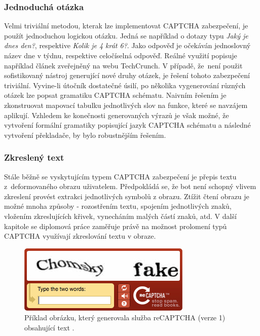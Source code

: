 \documentclass[
  field=ainfp,
  master=true,
  biblatex,
  sourcecodes=false,
  theorems=false,
  glossaries,
  index
]{kidiplom}
\begin{document}
\subsubsection*{Jednoduchá otázka}
Velmi triviální metodou, kterak lze implementovat CAPTCHA zabezpečení, je použít jednoduchou logickou otázku. Jedná se například o dotazy typu \textit{Jaký je dnes den?}, respektive \textit{Kolik je 4 krát 6?}. Jako odpověď je očekáván jednoslovný název dne v týdnu, respektive celočíselná odpověď. Reál\-né využití popisuje například článek zveřejněný na webu TechCrunch\cite{web:textcaptcha}. V případě, že~není použit sofistikovaný nástroj generující nové druhy otázek, je řešení tohoto zabez\-pe\-čení triviální. Vyvine-li útočník dostatečné úsilí, po několika vygenerování různých otázek lze popsat gramatiku CAPTCHA schématu. Naivním řešením je zkonstruovat mapovací tabulku jednotlivých slov na funkce, které se navzájem aplikují. Vzhledem ke konečnosti generovaných výrazů je však možné, že vytvoření formální gramatiky popisující jazyk CAPTCHA schématu a následné vytvoření překladače, by bylo robustnějším řešením. 

\subsubsection*{Zkreslený text}
Stále běžně se vyskytujícím typem CAPTCHA zabezpečení je přepis textu z~deformovaného obrazu uživatelem. Předpokládá se, že bot není schopný vlivem zkreslení provést extrakci jednotlivých symbolů z obrazu. Ztížit čtení obrazu je možné mnoha způsoby - rozostřením textu, spojením jednotlivých znaků, vložením zkreslujících křivek, vynecháním malých částí znaků, atd. V další kapitole se diplomová práce zaměřuje právě na možnost prolomení typů CAPTCHA využívají zkreslování textu v obraze.

\begin{figure}[H]
  \centering
  \includegraphics[scale=0.8]{images/text_image_captcha.jpg}
  \caption{Příklad obrázku, který generovala služba reCAPTCHA (verze 1) obsahující text .}
  \label{fig:captcha_text_image}
\end{figure}
\end{document}
